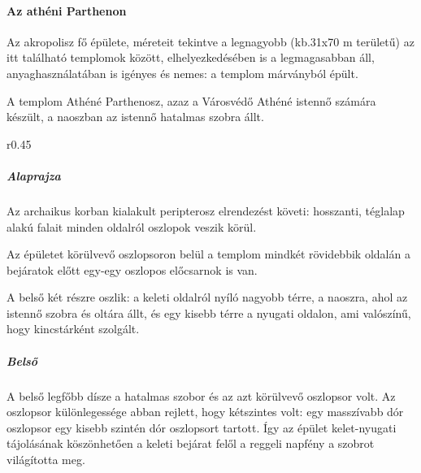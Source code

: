 \paragraph{Az athéni Parthenon}

Az akropolisz fő épülete, méreteit tekintve a legnagyobb (kb.31x70 m területű) az itt található templomok között, elhelyezkedésében is a legmagasabban áll, anyaghasználatában is igényes és nemes: a templom márványból épült.

A templom Athéné Parthenosz, azaz a Városvédő Athéné istennő számára készült, a naoszban az istennő hatalmas szobra állt.


\begin{wrapfigure}{r}{0.45\textwidth}
	\centering
	\begin{minipage}{0.45\textwidth}
	\end{minipage}

	\begin{minipage}{0.45\textwidth}
	\end{minipage}

	\begin{minipage}{0.45\textwidth}
	\end{minipage}
\end{wrapfigure}
\subparagraph{Alaprajza}
Az archaikus korban kialakult peripterosz elrendezést követi: hosszanti, téglalap alakú falait minden oldalról oszlopok veszik körül.

Az épületet körülvevő oszlopsoron belül a templom mindkét rövidebbik oldalán a bejáratok előtt egy-egy oszlopos előcsarnok is van.

A belső két részre oszlik: a keleti oldalról nyíló nagyobb térre, a naoszra, ahol az istennő szobra és oltára állt, és egy kisebb térre a nyugati oldalon, ami valószínű, hogy kincstárként szolgált.

\subparagraph{Belső}
A belső legfőbb dísze a hatalmas szobor és az azt körülvevő oszlopsor volt. Az oszlopsor különlegessége abban rejlett, hogy kétszintes volt: egy masszívabb dór oszlopsor egy kisebb szintén dór oszlopsort tartott. Így az épület kelet-nyugati tájolásának köszönhetően a keleti bejárat felől a reggeli napfény a szobrot világította meg.

